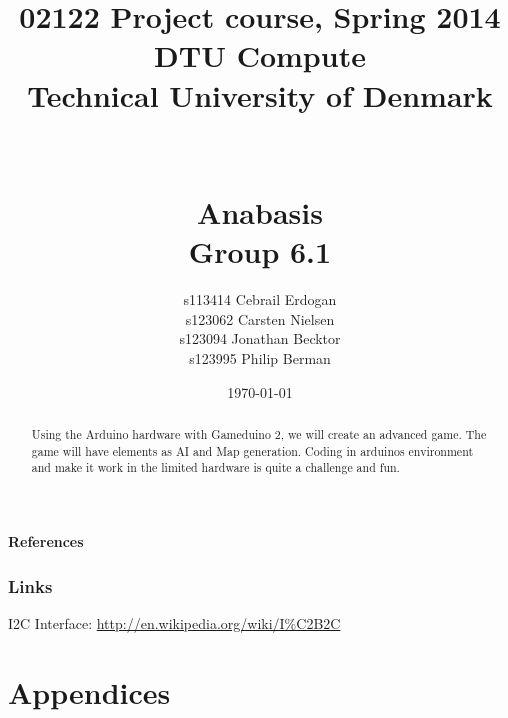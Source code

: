 \documentclass[12pt]{report}
\title{02122 Project course, Spring 2014 \\
DTU Compute \\
Technical University of Denmark \\~\\~\\ Anabasis \\ Group 6.1}
\author{s113414 Cebrail Erdogan \\
        s123062 Carsten Nielsen \\
        s123094 Jonathan Becktor\\
        s123995 Philip Berman   \\  }
\date{\today}
\begin{document}
\pagestyle{headings}



\maketitle

\begin{abstract}
Using the Arduino hardware with Gameduino 2, we will create an advanced game.
The game will have elements as AI and Map generation.
Coding in arduinos environment and make it work in the
limited hardware is quite a challenge and fun.
\end{abstract}


\tableofcontents

\newpage



\newpage





















\newpage

\textbf{References}

\subsection*{Links}


I2C Interface: \url{http://en.wikipedia.org/wiki/I%C2B2C}

\newpage
\chapter{Appendices}
\end{document}
